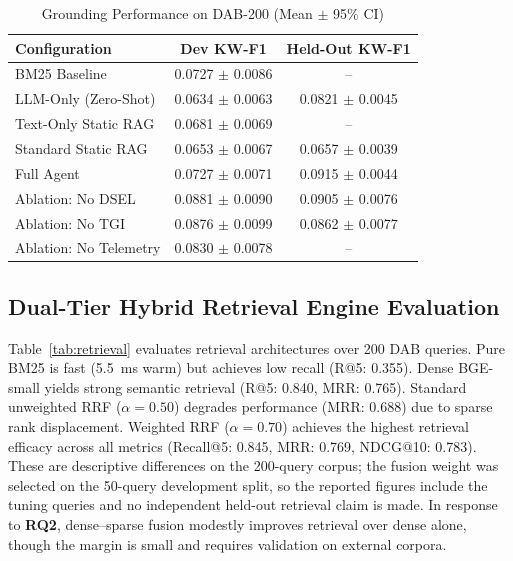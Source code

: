 \documentclass[conference]{IEEEtran}
\begin{document}
\begin{table}[ht]
\caption{Grounding Performance on DAB-200 (Mean $\pm$ 95\% CI)}
\label{tab:main}
\centering
\footnotesize
\setlength{\tabcolsep}{4pt}
\begin{tabular*}{\columnwidth}{@{\extracolsep{\fill}}lcc@{}}
\toprule
Configuration & Dev KW-F1 & Held-Out KW-F1 \\
\midrule
BM25 Baseline & 0.0727 $\pm$ 0.0086 & -- \\
LLM-Only (Zero-Shot) & 0.0634 $\pm$ 0.0063 & 0.0821 $\pm$ 0.0045 \\
Text-Only Static RAG & 0.0681 $\pm$ 0.0069 & -- \\
Standard Static RAG & 0.0653 $\pm$ 0.0067 & 0.0657 $\pm$ 0.0039 \\
Full Agent & 0.0727 $\pm$ 0.0071 & 0.0915 $\pm$ 0.0044 \\
\midrule
Ablation: No DSEL & 0.0881 $\pm$ 0.0090 & 0.0905 $\pm$ 0.0076 \\
Ablation: No TGI & 0.0876 $\pm$ 0.0099 & 0.0862 $\pm$ 0.0077 \\
Ablation: No Telemetry & 0.0830 $\pm$ 0.0078 & -- \\
\bottomrule
\end{tabular*}
\end{table}

\subsection{Dual-Tier Hybrid Retrieval Engine Evaluation}
Table~\ref{tab:retrieval} evaluates retrieval architectures over 200 DAB queries. Pure BM25 is fast (5.5~ms warm) but achieves low recall (R@5: 0.355). Dense BGE-small yields strong semantic retrieval (R@5: 0.840, MRR: 0.765). Standard unweighted RRF ($\alpha = 0.50$) degrades performance (MRR: 0.688) due to sparse rank displacement. Weighted RRF ($\alpha = 0.70$) achieves the highest retrieval efficacy across all metrics (Recall@5: 0.845, MRR: 0.769, NDCG@10: 0.783). These are descriptive differences on the 200-query corpus; the fusion weight was selected on the 50-query development split, so the reported figures include the tuning queries and no independent held-out retrieval claim is made. In response to \textbf{RQ2}, dense--sparse fusion modestly improves retrieval over dense alone, though the margin is small and requires validation on external corpora.
\end{document}

